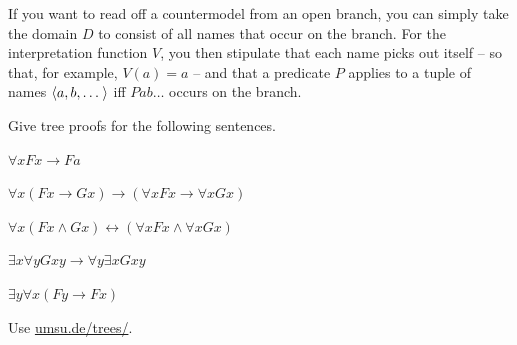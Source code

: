 \begin{minipage}{0.24\textwidth} \centering
{}
\end{minipage}
\begin{minipage}{0.24\textwidth}\centering
{}
\end{minipage}
\begin{minipage}{0.24\textwidth}\centering
{}
\end{minipage}
\begin{minipage}{0.24\textwidth} \centering
{}
\end{minipage}

\medskip

If you want to read off a countermodel from an open branch, you can simply take
the domain $D$ to consist of all names that occur on the branch. For the
interpretation function $V$, you then stipulate that each name picks out itself
-- so that, for example, $V(a) = a$ -- and that a predicate $P$ applies to a
tuple of names $\t{a,b,\ldots}$ iff $Pab\ldots$ occurs on the branch.

\begin{exercise}
  Give tree proofs for the following sentences.
  \begin{exlist}
  \item $\forall x Fx \to Fa$
  \item $\forall x (Fx \to Gx) \to (\forall x Fx \to \forall x Gx)$
  \item $\forall x (Fx \land Gx) \leftrightarrow (\forall x Fx \land \forall x Gx)$
  \item $\exists x\forall y Gxy \to \forall y \exists x Gxy$
  \item $\exists y \forall x(Fy \to Fx)$
  \end{exlist}
\end{exercise}
\begin{solution}
  Use \href{https://www.umsu.de/trees/}{umsu.de/trees/}.
\end{solution}

